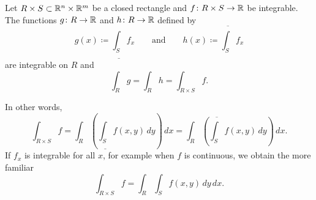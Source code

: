 \begin{thm} \label{mv:fubinivA} 
Let $R \times S \subset {\mathbb{R}}^n \times {\mathbb{R}}^m$ be a closed rectangle and
$f \colon R \times S \to {\mathbb{R}}$ be integrable.
The functions $g \colon R \to {\mathbb{R}}$ and $h \colon R \to {\mathbb{R}}$ defined by
\begin{equation*}
g(x) \coloneqq \underline{\int_S} f_x \qquad
\text{and} \qquad
h(x) \coloneqq \overline{\int_S} f_x 
\end{equation*}
are integrable on $R$ and
\begin{equation*}
\int_R g = \int_R h = \int_{R \times S} f .
\end{equation*}
\end{thm}

In other words,
\begin{equation*}
\int_{R \times S} f
=
 \int_R \left(
 \underline{\int_S} f(x,y) \, dy
\right) \, dx
=
 \int_R \left(
 \overline{\int_S} f(x,y) \, dy
\right) \, dx .
\end{equation*}
If $f_x$ is integrable for all $x$, for example when
$f$ is continuous, we obtain the more familiar
\begin{equation*}
\int_{R \times S} f
=
 \int_R \int_S f(x,y) \, dy \, dx .
\end{equation*}

